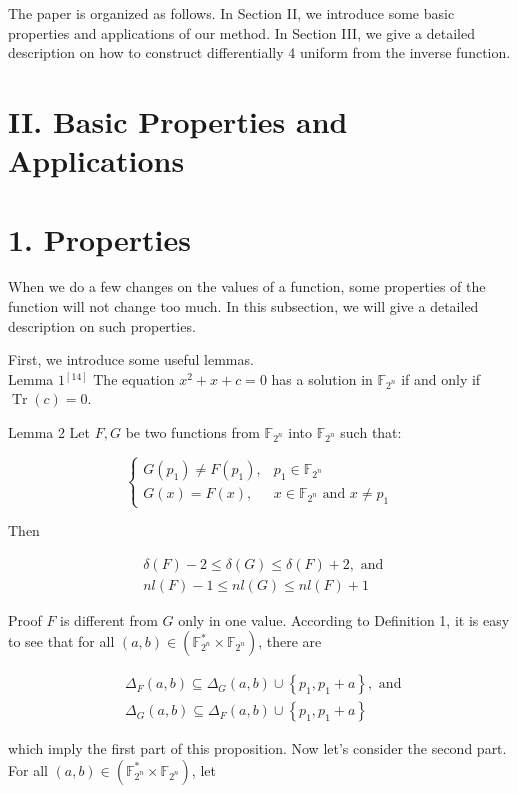 \documentclass[10pt]{article}
\begin{document}
The paper is organized as follows. In Section II, we introduce some basic properties and applications of our method. In Section III, we give a detailed description on how to construct differentially 4 uniform from the inverse function.

\section*{II. Basic Properties and Applications}
\section*{1. Properties}
When we do a few changes on the values of a function, some properties of the function will not change too much. In this subsection, we will give a detailed description on such properties.

First, we introduce some useful lemmas.\\
Lemma $1{ }^{[14]}$ The equation $x^{2}+x+c=0$ has a solution in $\mathbb{F}_{2^{n}}$ if and only if $\operatorname{Tr}(c)=0$.

Lemma 2 Let $F, G$ be two functions from $\mathbb{F}_{2^{n}}$ into $\mathbb{F}_{2^{n}}$ such that:

$$
\begin{cases}G\left(p_{1}\right) \neq F\left(p_{1}\right), & p_{1} \in \mathbb{F}_{2^{n}} \\ G(x)=F(x), & x \in \mathbb{F}_{2^{n}} \text { and } x \neq p_{1}\end{cases}
$$

Then

$$
\begin{aligned}
& \delta(F)-2 \leq \delta(G) \leq \delta(F)+2, \text { and } \\
& n l(F)-1 \leq n l(G) \leq n l(F)+1
\end{aligned}
$$

Proof $F$ is different from $G$ only in one value. According to Definition 1, it is easy to see that for all $(a, b) \in\left(\mathbb{F}_{2^{n}}^{*} \times \mathbb{F}_{2^{n}}\right)$, there are

$$
\begin{aligned}
& \Delta_{F}(a, b) \subseteq \Delta_{G}(a, b) \cup\left\{p_{1}, p_{1}+a\right\}, \text { and } \\
& \Delta_{G}(a, b) \subseteq \Delta_{F}(a, b) \cup\left\{p_{1}, p_{1}+a\right\}
\end{aligned}
$$

which imply the first part of this proposition. Now let's consider the second part. For all $(a, b) \in\left(\mathbb{F}_{2^{n}}^{*} \times \mathbb{F}_{2^{n}}\right)$, let
\end{document}
